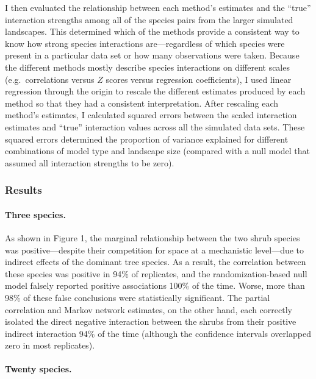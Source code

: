 I then evaluated the relationship between each method's estimates and
the ``true'' interaction strengths among all of the species pairs from
the larger simulated landscapes. This determined which of the methods
provide a consistent way to know how strong species interactions
are---regardless of which species were present in a particular data set
or how many observations were taken. Because the different methods
mostly describe species interactions on different scales
(e.g.~correlations versus \(Z\) scores versus regression coefficients),
I used linear regression through the origin to rescale the different
estimates produced by each method so that they had a consistent
interpretation. After rescaling each method's estimates, I calculated
squared errors between the scaled interaction estimates and ``true''
interaction values across all the simulated data sets. These squared
errors determined the proportion of variance explained for different
combinations of model type and landscape size (compared with a null
model that assumed all interaction strengths to be zero).

\subsubsection{Results}\label{results}

\paragraph{Three species.}\label{three-species.}

As shown in Figure 1, the marginal relationship between the two shrub
species was positive---despite their competition for space at a
mechanistic level---due to indirect effects of the dominant tree
species. As a result, the correlation between these species was positive
in 94\% of replicates, and the randomization-based null model falsely
reported positive associations 100\% of the time. Worse, more than 98\%
of these false conclusions were statistically significant. The partial
correlation and Markov network estimates, on the other hand, each
correctly isolated the direct negative interaction between the shrubs
from their positive indirect interaction 94\% of the time (although the
confidence intervals overlapped zero in most replicates).

\paragraph{Twenty species.}\label{twenty-species.}

